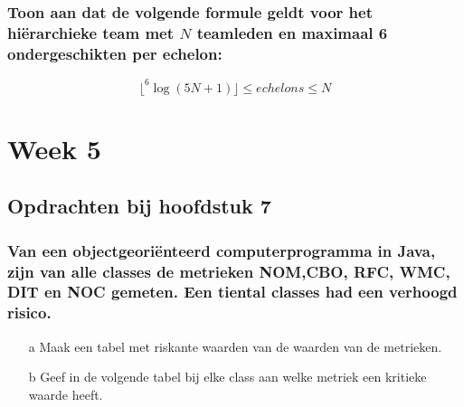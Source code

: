 \documentclass[a4paper,titlepage]{artikel1}
\begin{document}
   \subsubsection[Opdracht 4]{Toon aan dat de volgende formule geldt voor het hi\"{e}rarchieke team met $N$ teamleden en maximaal 6 ondergeschikten per echelon:}
   \begin{displaymath}
     \lfloor^6\log{(5N+1)}\rfloor\leq echelons\leq N
   \end{displaymath}

   \section{Week 5}
   \subsection{Opdrachten bij hoofdstuk 7}
   \subsubsection[Opdracht 1]{Van een objectgeori\"{e}nteerd computerprogramma in Java, zijn van alle classes de metrieken NOM,CBO, RFC, WMC, DIT en NOC gemeten. Een tiental classes had een verhoogd risico.}
   \begin{itemize}
     \item[a] Maak een tabel met riskante waarden van de waarden van de metrieken.
     \item[b] Geef in de volgende tabel bij elke class aan welke metriek een kritieke waarde heeft.
   \end{itemize}
   
\end{document}
